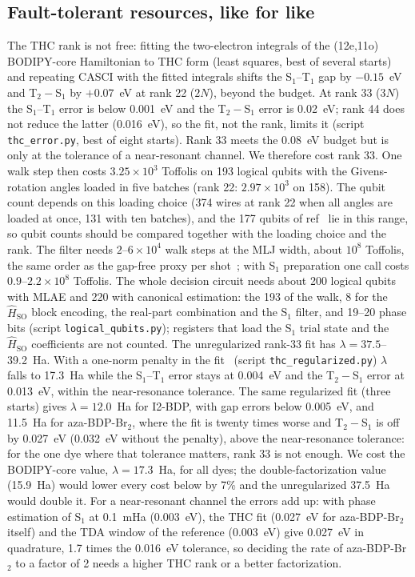 \documentclass[journal=jctcce,manuscript=article]{achemso}
\newcommand{\Hso}{\hat H_\mathrm{SO}}
\begin{document}
\subsection{Fault-tolerant resources, like for like}
\label{sec:resources}

The THC rank is not free: fitting the two-electron integrals of the (12e,11o) BODIPY-core Hamiltonian to THC
form (least squares, best of several starts) and repeating CASCI with the fitted integrals shifts the S$_1$--T$_1$
gap by $-0.15$~eV and T$_2-$S$_1$ by $+0.07$~eV at rank 22 ($2N$), beyond the budget. At rank 33 ($3N$) the
S$_1$--T$_1$ error is below 0.001~eV and the T$_2-$S$_1$ error is 0.02~eV; rank 44 does not reduce the latter
(0.016~eV), so the fit, not the rank, limits it (script \texttt{thc\_error.py}, best of eight starts). Rank 33
meets the 0.08~eV budget but is only at the tolerance of a near-resonant channel. We therefore cost rank 33. One walk step then costs
$3.25\times10^{3}$ Toffolis on 193 logical qubits with the Givens-rotation angles loaded in five batches (rank 22:
$2.97\times10^{3}$ on 158). The qubit count depends on this loading choice (374 wires at rank 22 when all angles are
loaded at once, 131 with ten batches), and the 177 qubits of ref~ lie in this range, so qubit
counts should be compared together with the loading choice and the rank. The filter needs $2$--$6\times10^{4}$
walk steps at the MLJ width, about $10^{8}$ Toffolis, the same order as the gap-free proxy per
shot~\cite{Zhou2026PRA}; with S$_1$ preparation one call costs $0.9$--$2.2\times10^{8}$ Toffolis. The whole decision
circuit needs about 200 logical qubits with MLAE and 220 with canonical estimation: the 193 of the walk, 8 for the
$\Hso$ block encoding, the real-part combination and the S$_1$ filter, and 19--20 phase bits (script
\texttt{logical\_qubits.py}); registers that load the S$_1$ trial state and the $\Hso$ coefficients are not counted. The unregularized rank-33 fit has
$\lambda=37.5$--39.2~Ha. With a one-norm penalty in the fit~\cite{Lee2021} (script \texttt{thc\_regularized.py})
$\lambda$ falls to 17.3~Ha while the S$_1$--T$_1$ error stays at 0.004~eV and the T$_2-$S$_1$ error at 0.013~eV, within the
near-resonance tolerance. The same regularized fit (three starts) gives $\lambda=12.0$~Ha for I2-BDP, with gap errors
below 0.005~eV, and 11.5~Ha for aza-BDP-Br$_2$, where the fit is twenty times worse and T$_2-$S$_1$ is off by
0.027~eV (0.032~eV without the penalty), above the near-resonance tolerance: for the one dye where that tolerance
matters, rank 33 is not enough. We cost the BODIPY-core value, $\lambda=17.3$~Ha, for all dyes; the double-factorization value
(15.9~Ha) would lower every cost below by 7\% and the unregularized 37.5~Ha would double it.
For a near-resonant channel the errors add up: with phase estimation of S$_1$ at 0.1~mHa (0.003~eV), the THC
fit (0.027~eV for aza-BDP-Br$_2$ itself) and the TDA window of the reference (0.003~eV) give 0.027~eV in
quadrature, 1.7 times the 0.016~eV tolerance, so deciding the rate of aza-BDP-Br$_2$ to a factor of 2 needs a higher
THC rank or a better factorization.
\end{document}
